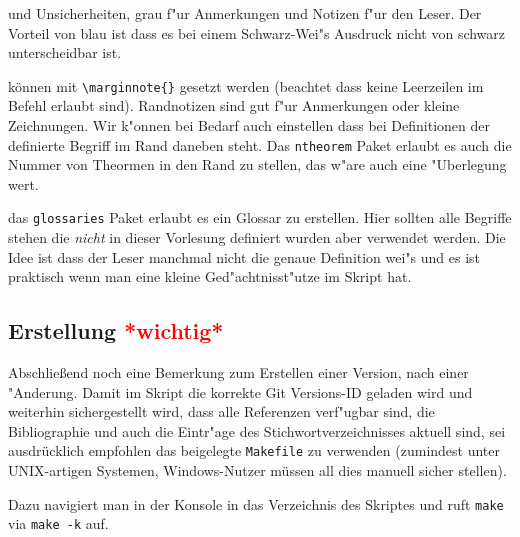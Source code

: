 \documentclass[paper=A4, twoside, chapterprefix=true, bibliography=totoc, headsepline]{scrbook}
\begin{document}
\begin{description}[font=\normalfont\itshape]
    und Unsicherheiten, grau f"ur Anmerkungen und Notizen f"ur den
    Leser. Der Vorteil von blau ist dass es bei einem Schwarz-Wei"s
    Ausdruck nicht von schwarz unterscheidbar ist.
  \item[Randnotizen:] können mit \verb|\marginnote{}| gesetzt werden
    (beachtet dass keine Leerzeilen im Befehl erlaubt
    sind). Randnotizen sind gut f"ur Anmerkungen oder kleine
    Zeichnungen. Wir k"onnen bei Bedarf auch einstellen dass bei
    Definitionen der definierte Begriff im Rand daneben steht. Das
    \verb|ntheorem| Paket erlaubt es auch die Nummer von Theormen in
    den Rand zu stellen, das w"are auch eine "Uberlegung wert.
  \item[Glossareintr"age:] das \verb|glossaries| Paket erlaubt es ein
    Glossar zu erstellen. Hier sollten alle Begriffe stehen die
    \emph{nicht} in dieser Vorlesung definiert wurden aber verwendet
    werden. Die Idee ist dass der Leser manchmal nicht die genaue
    Definition wei"s und es ist praktisch wenn man eine kleine
    Ged"achtnisst"utze im Skript hat.
  \end{description}

  \subsection*{Erstellung \textcolor{red}{*wichtig*}}

  Abschließend noch eine Bemerkung zum Erstellen einer 
  Version, nach einer "Anderung. Damit im Skript die korrekte Git
  Versions-ID geladen wird und weiterhin sichergestellt wird, dass alle
  Referenzen verf"ugbar sind, die Bibliographie und auch die Eintr"age
  des Stichwortverzeichnisses aktuell sind, sei ausdrücklich empfohlen
  das beigelegte \verb|Makefile| zu verwenden (zumindest unter
  UNIX-artigen Systemen, Windows-Nutzer müssen all dies manuell sicher
  stellen).

  Dazu navigiert man in der Konsole in das Verzeichnis des Skriptes
  und ruft \verb|make| via \verb|make -k| auf.


    
    
    



  \appendix

\end{document}
